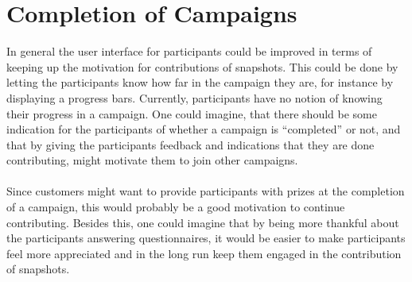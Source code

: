 
\section{Completion of Campaigns}
\label{sec:completion_of_campaigns}

In general the user interface for participants could be improved in terms of keeping up the motivation for contributions of snapshots. This could be done by letting the participants know how far in the campaign they are, for instance by displaying a progress bars. Currently, participants have no notion of knowing their progress in a campaign. One could imagine, that there should be some indication for the participants of whether a campaign is  ``completed'' or not, and that by giving the participants feedback and indications that they are done contributing, might motivate them to join other campaigns. 
\\\\
Since customers might want to provide participants with prizes at the completion of a campaign, this would probably be a good motivation to continue contributing. Besides this, one could imagine that by being more thankful about the participants answering questionnaires, it would be easier to make participants feel more appreciated and in the long run keep them engaged in the contribution of snapshots.